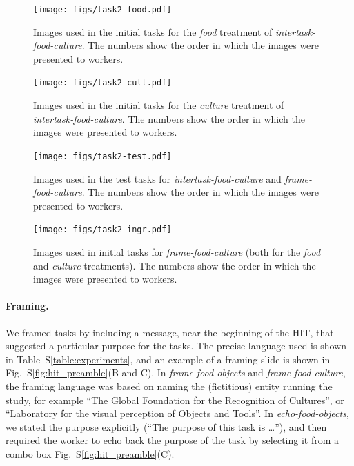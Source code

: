 \documentclass[12pt]{article}
\begin{document}
\begin{figure}
	\begin{center}
	\texttt{[image: figs/task2-food.pdf]}
	\end{center}
	\caption{
		Images used in the initial tasks for the
		\textit{food} treatment of \textit{intertask-food-culture}.  
		The numbers show the order in which the 
		images were presented to workers.
	}
	\label{fig:task2:food}
\end{figure}

\begin{figure}
	\begin{center}
	\texttt{[image: figs/task2-cult.pdf]}
	\end{center}
	\caption{
		Images used in the initial tasks for the
		\textit{culture} treatment of \textit{intertask-food-culture}.  
		The numbers show the order in which the 
		images were presented to workers.
	}
	\label{fig:task2:cult}
\end{figure}

\begin{figure}
	\begin{center}
	\texttt{[image: figs/task2-test.pdf]}
	\end{center}
	\caption{
		Images used in the test tasks for \textit{intertask-food-culture} 
		and \textit{frame-food-culture}.  
		The numbers show the order in which the 
		images were presented to workers.
	}
	\label{fig:task2:test}
\end{figure}

\begin{figure}
	\begin{center}
		\texttt{[image: figs/task2-ingr.pdf]}
	\end{center}
	\caption{
		Images used in initial tasks for \textit{frame-food-culture} 
		(both for the \textit{food} and \textit{culture} treatments).
		The numbers show the order in which the images were presented to 
		workers.
	}
	\label{fig:frame2:ingr}
\end{figure}

\paragraph{Framing.}
We framed tasks by including a message, near the beginning of the HIT, that 
suggested a particular purpose for the tasks.
The precise language used is shown in 
Table~S\ref{table:experiments}, and an example of a framing slide is shown in
Fig.~S\ref{fig:hit_preamble}(B and C).  In \textit{frame-food-objects}
and \textit{frame-food-culture}, the framing language was based on
naming the (fictitious) entity running the study, for example
``The Global Foundation for the Recognition of Cultures'',
or ``Laboratory for the visual perception of Objects and Tools''.
In \textit{echo-food-objects}, we stated the purpose explicitly 
(``The purpose of this task is \dots''), and then required the worker to
echo back the purpose of the task by selecting it from a combo box
Fig.~S\ref{fig:hit_preamble}(C).
\end{document}
